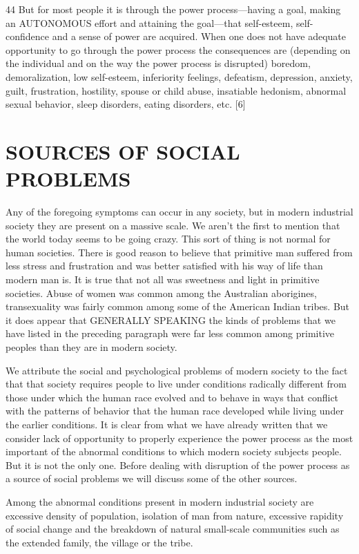 {44} But for most people it is through the power process—having a goal, making an AUTONOMOUS effort and attaining the goal—that self-esteem, self-confidence and a sense of power are acquired. When one does not have adequate opportunity to go through the power process the consequences are (depending on the individual and on the way the power process is disrupted) boredom, demoralization, low self-esteem, inferiority feelings, defeatism, depression, anxiety, guilt, frustration, hostility, spouse or child abuse, insatiable hedonism, abnormal sexual behavior, sleep disorders, eating disorders, etc. [6]

\chapter{SOURCES OF SOCIAL PROBLEMS}

 Any of the foregoing symptoms can occur in any society, but in modern industrial society they are present on a massive scale. We aren’t the first to mention that the world today seems to be going crazy. This sort of thing is not normal for human societies. There is good reason to believe that primitive man suffered from less stress and frustration and was better satisfied with his way of life than modern man is. It is true that not all was sweetness and light in primitive societies. Abuse of women was common among the Australian aborigines, transexuality was fairly common among some of the American Indian tribes. But it does appear that GENERALLY SPEAKING the kinds of problems that we have listed in the preceding paragraph were far less common among primitive peoples than they are in modern society.

 We attribute the social and psychological problems of modern society to the fact that that society requires people to live under conditions radically different from those under which the human race evolved and to behave in ways that conflict with the patterns of behavior that the human race developed while living under the earlier conditions. It is clear from what we have already written that we consider lack of opportunity to properly experience the power process as the most important of the abnormal conditions to which modern society subjects people. But it is not the only one. Before dealing with disruption of the power process as a source of social problems we will discuss some of the other sources.

 Among the abnormal conditions present in modern industrial society are excessive density of population, isolation of man from nature, excessive rapidity of social change and the breakdown of natural small-scale communities such as the extended family, the village or the tribe.


